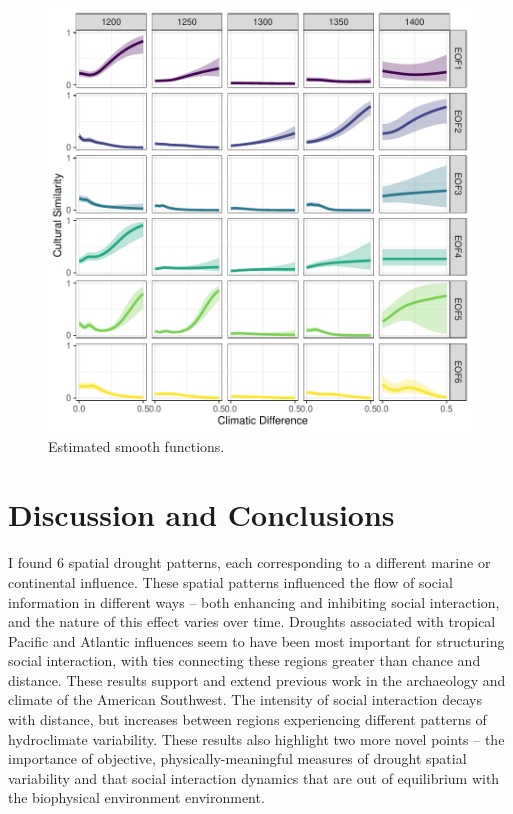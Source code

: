 \documentclass[10pt]{iopart}
\begin{document}
\begin{figure}[!htbp]
\centering
\includegraphics[width=.8\linewidth]{figures/smooths.pdf}
\caption{Estimated smooth functions.}
\label{fig:smooths}
\end{figure}

\section*{Discussion and Conclusions}
I found 6 spatial drought patterns, each corresponding to a different marine or continental influence. These spatial patterns influenced the flow of social information in different ways -- both enhancing and inhibiting social interaction, and the nature of this effect varies over time. Droughts associated with tropical Pacific and Atlantic influences seem to have been most important for structuring social interaction, with ties connecting these regions greater than chance and distance. These results support and extend previous work in the archaeology and climate of the American Southwest. The intensity of social interaction decays with distance, but increases between regions experiencing different patterns of hydroclimate variability. These results also highlight two more novel points -- the importance of objective, physically-meaningful measures of drought spatial variability and that social interaction dynamics that are out of equilibrium with the biophysical environment environment.
\end{document}

